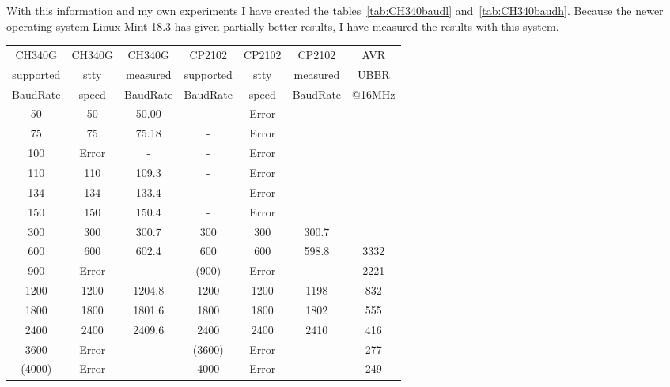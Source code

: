 With this information and my own experiments I have created the tables~\ref{tab:CH340baudl} and~\ref{tab:CH340baudh}.
Because the newer operating system Linux Mint 18.3 has given partially better results, I have
measured the results with this system.

\begin{table}[H]
  \begin{center}
    \begin{tabular}{| c | c | c || c | c | c || c |}
    \hline
    CH340G     & CH340G & CH340G   &  CP2102   & CP2102 & CP2102    & AVR \\
    supported  & stty  & measured  & supported & stty   & measured  & UBBR  \\
    BaudRate   & speed & BaudRate  & BaudRate  & speed  & BaudRate  & @16MHz \\
    \hline
    \hline
         50    & 50    &   50.00   &    -      & Error  &           &       \\
    \hline
         75    & 75    &   75.18   &    -      & Error  &           &        \\
    \hline
        100    & Error &    -      &    -      & Error  &           &        \\
    \hline
        110    & 110   &   109.3   &    -      & Error  &           &        \\
    \hline
        134    & 134   &   133.4   &    -      & Error  &           &       \\
    \hline
        150    & 150   &   150.4   &    -      & Error  &           &        \\
    \hline
        300    & 300   &   300.7   &   300     &  300   &   300.7    &       \\
    \hline
        600    & 600   &   602.4   &   600     &  600   &   598.8   &  3332  \\
    \hline
        900    & Error &    -      &  (900)   &  Error &    -      &  2221 \\
    \hline
       1200    & 1200  &   1204.8  &   1200    &  1200  &   1198    &   832  \\
    \hline
       1800    & 1800  &   1801.6  &   1800    &  1800  &   1802    &   555 \\
    \hline
       2400    & 2400  &   2409.6  &   2400    &  2400  &   2410    &   416  \\
    \hline
       3600    & Error &   -       &  (3600)  &  Error &    -      &   277  \\
    \hline
      (4000)   & Error &   -       &   4000    &  Error &    -      &   249  \\

\end{tabular}
\end{center}
\end{table}
